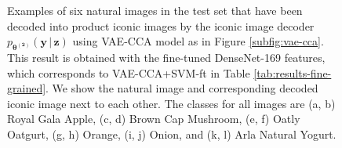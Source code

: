 \begin{figure}[t]
\begin{subfigure}[b]{0.18\textwidth}
		\caption{}
		\label{subfig:yogurt-decoded}
	\end{subfigure}
	\vspace{-2mm}
	\caption{ 
	Examples of six natural images in the test set that have been decoded into product iconic images by the iconic image decoder $p_{\boldsymbol{\theta^{(2)}}}(\mathbf{y}\,|\,\mathbf{z})$ using VAE-CCA model as in Figure \ref{subfig:vae-cca}. This result is obtained with the fine-tuned DenseNet-169 features, which corresponds to VAE-CCA+SVM-ft in Table \ref{tab:results-fine-grained}. 
	We show the natural image and corresponding decoded iconic image next to each other. The classes for all images are (a, b) Royal Gala Apple, (c, d) Brown Cap Mushroom, (e, f) Oatly Oatgurt, (g, h) Orange, (i, j) Onion, and (k, l) Arla Natural Yogurt.
} 
	\label{fig:decoded-images}
\end{figure}

